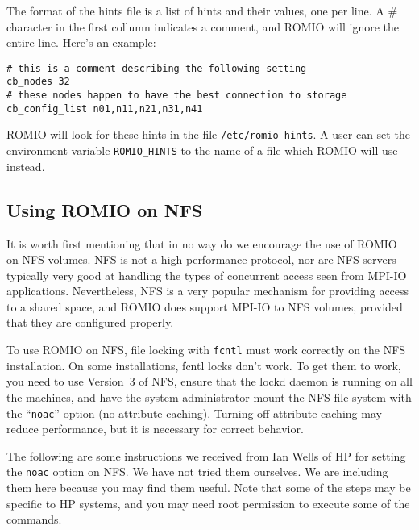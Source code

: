 The format of the hints file is a list of hints and their values, one per line.
A # character in the first collumn indicates a comment, and ROMIO will ignore
the entire line.  Here's an example:

\begin{verbatim}
# this is a comment describing the following setting
cb_nodes 32
# these nodes happen to have the best connection to storage
cb_config_list n01,n11,n21,n31,n41
\end{verbatim}

ROMIO will look for these hints in the file \texttt{/etc/romio-hints}.  A user
can set the environment variable \texttt{ROMIO\_HINTS} to the name of a file
which ROMIO will use instead.   

\subsection{Using ROMIO on NFS}

It is worth first mentioning that in no way do we encourage the use
of ROMIO on NFS volumes.  NFS is not a high-performance protocol, nor
are NFS servers typically very good at handling the types of concurrent
access seen from MPI-IO applications.  Nevertheless, NFS is a very popular
mechanism for providing access to a shared space, and ROMIO does support
MPI-IO to NFS volumes, provided that they are configured properly.

To use ROMIO on NFS, file locking with {\tt fcntl} must work correctly
on the NFS installation. On some installations, fcntl locks don't
work.  To get them to work, you need to use Version~3 of NFS, ensure
that the lockd daemon is running on all the machines, and have the system
administrator mount the NFS file system with the ``{\tt noac}'' option
(no attribute caching). Turning off attribute caching may reduce
performance, but it is necessary for correct behavior.

The following are some instructions we received from Ian Wells of HP
for setting the {\tt noac} option on NFS. We have not tried them
ourselves. We are including them here because you may find 
them useful. Note that some of the steps may be specific to HP
systems, and you may need root permission to execute some of the
commands. 

